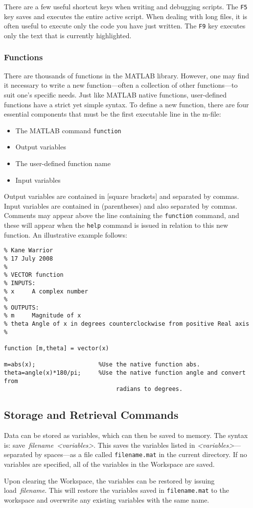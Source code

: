 There are a few useful shortcut keys when writing and debugging scripts.  The \verb=F5= key saves and executes the entire active script.  When dealing with long files, it is often useful to execute only the code you have just written. The \verb=F9= key executes only the text that is currently highlighted.

\subsubsection{Functions}
There are thousands of functions in the MATLAB library.  However, one may find it necessary to write a new function---often a collection of other functions---to suit one's specific needs.  Just like MATLAB native functions, user-defined functions have a strict yet simple syntax.  To define a new function, there are four essential components that must be the first executable line in the m-file:
\begin{itemize}
    \item The MATLAB command \verb=function=
    \item Output variables
    \item The user-defined function name
    \item Input variables
\end{itemize}

Output variables are contained in [square brackets] and separated by commas. Input variables are contained in (parentheses) and also separated by commas.  Comments may appear above the line containing the \verb=function= command, and these will appear when the \verb=help= command is issued in relation to this new function.  An illustrative example follows:
\begin{verbatim}
% Kane Warrior
% 17 July 2008
%
% VECTOR function
% INPUTS:
% x     A complex number
%
% OUTPUTS:
% m     Magnitude of x
% theta Angle of x in degrees counterclockwise from positive Real axis
%

function [m,theta] = vector(x)

m=abs(x);                  %Use the native function abs.
theta=angle(x)*180/pi;     %Use the native function angle and convert from
                                radians to degrees.
\end{verbatim}

\subsection{Storage and Retrieval Commands}
Data can be stored as variables, which can then be saved to memory.  The syntax is: \mbox{\ttfamily save \textit{filename <variables>}}.  This saves the variables listed in \mbox{\ttfamily \textit{<variables>}}---separated by spaces---as a file called \verb=filename.mat= in the current directory.  If no variables are specified, all of the variables in the Workspace are saved.
\par
Upon clearing the Workspace, the variables can be restored by issuing \mbox{\ttfamily load \textit{filename}}.  This will restore the variables saved in \verb=filename.mat= to the workspace and overwrite any existing variables with the same name.